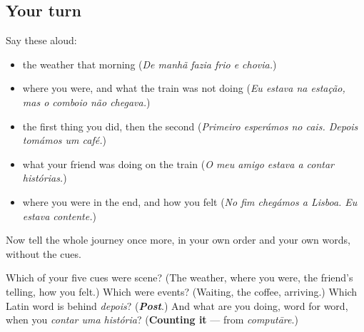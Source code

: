 \subsection*{Your turn}
Say these aloud:

\begin{itemize}
\raggedright
  \item the weather that morning (\emph{De manhã fazia frio e chovia.})
  \item where you were, and what the train was not doing (\emph{Eu estava na estação, mas o comboio não chegava.})
  \item the first thing you did, then the second (\emph{Primeiro esperámos no cais. Depois tomámos um café.})
  \item what your friend was doing on the train (\emph{O meu amigo estava a contar histórias.})
  \item where you were in the end, and how you felt (\emph{No fim chegámos a Lisboa. Eu estava contente.})
\end{itemize}

Now tell the whole journey once more, in your own order and your own words, without the cues.

\begin{tcolorbox}[breakable,colback=teal!4,colframe=teal!35!black,title={Before you move on}]
Which of your five cues were scene? (The weather, where you were, the friend's telling, how you felt.) Which were events? (Waiting, the coffee, arriving.) Which Latin word is behind \emph{depois}? (\emph{\textbf{Post}}.) And what are you doing, word for word, when you \emph{contar uma história}? (\textbf{Counting it} — from \emph{computāre}.)
\end{tcolorbox}
